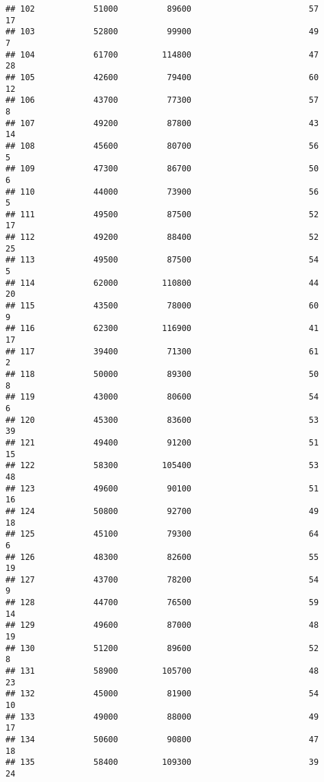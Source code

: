 \documentclass[
]{article}
\begin{document}
\begin{verbatim}
## 102            51000          89600                        57           17
## 103            52800          99900                        49            7
## 104            61700         114800                        47           28
## 105            42600          79400                        60           12
## 106            43700          77300                        57            8
## 107            49200          87800                        43           14
## 108            45600          80700                        56            5
## 109            47300          86700                        50            6
## 110            44000          73900                        56            5
## 111            49500          87500                        52           17
## 112            49200          88400                        52           25
## 113            49500          87500                        54            5
## 114            62000         110800                        44           20
## 115            43500          78000                        60            9
## 116            62300         116900                        41           17
## 117            39400          71300                        61            2
## 118            50000          89300                        50            8
## 119            43000          80600                        54            6
## 120            45300          83600                        53           39
## 121            49400          91200                        51           15
## 122            58300         105400                        53           48
## 123            49600          90100                        51           16
## 124            50800          92700                        49           18
## 125            45100          79300                        64            6
## 126            48300          82600                        55           19
## 127            43700          78200                        54            9
## 128            44700          76500                        59           14
## 129            49600          87000                        48           19
## 130            51200          89600                        52            8
## 131            58900         105700                        48           23
## 132            45000          81900                        54           10
## 133            49000          88000                        49           17
## 134            50600          90800                        47           18
## 135            58400         109300                        39           24

\end{verbatim}
\end{document}
